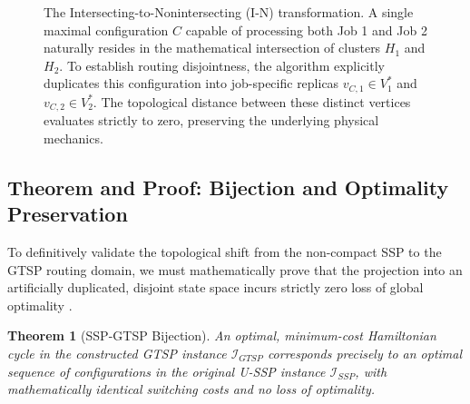 \documentclass[11pt, a4paper]{book}
\newtheorem{theorem}{Theorem}[chapter]
\begin{document}
\begin{figure}[H]
		\caption{The Intersecting-to-Nonintersecting (I-N) transformation. A single maximal configuration $C$ capable of processing both Job 1 and Job 2 naturally resides in the mathematical intersection of clusters $H_1$ and $H_2$. To establish routing disjointness, the algorithm explicitly duplicates this configuration into job-specific replicas $v_{C,1} \in V_1^*$ and $v_{C,2} \in V_2^*$. The topological distance between these distinct vertices evaluates strictly to zero, preserving the underlying physical mechanics.}
		\label{fig:in_transform}
	\end{figure}
	
	\subsection{Theorem and Proof: Bijection and Optimality Preservation}
	
	To definitively validate the topological shift from the non-compact SSP to the GTSP routing domain, we must mathematically prove that the projection into an artificially duplicated, disjoint state space incurs strictly zero loss of global optimality \cite{Lien1993}. %
	
	\begin{theorem}[SSP-GTSP Bijection]
		An optimal, minimum-cost Hamiltonian cycle in the constructed GTSP instance $\mathcal{I}_{GTSP}$ corresponds precisely to an optimal sequence of configurations in the original U-SSP instance $\mathcal{I}_{SSP}$, with mathematically identical switching costs and no loss of optimality. %
	\end{theorem}
	
\end{document}
